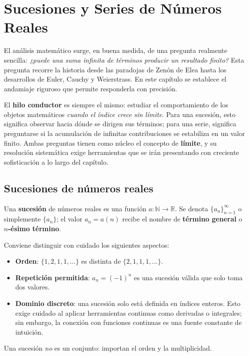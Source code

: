 
\chapter{Sucesiones y Series de Números Reales}

El análisis matemático surge, en buena medida, de una pregunta realmente sencilla: \emph{¿puede una suma infinita de términos producir un resultado
finito?} Esta pregunta recorre la historia desde las paradojas de Zenón de Elea
hasta los desarrollos de Euler, Cauchy y Weierstrass. En este capítulo se
establece el andamiaje riguroso que permite responderla con precisión.

El \textbf{hilo conductor} es siempre el mismo: estudiar el comportamiento de
los objetos matemáticos \emph{cuando el índice crece sin límite}. Para una
sucesión, esto significa observar hacia dónde se dirigen sus términos; para una
serie, significa preguntarse si la acumulación de infinitas contribuciones se
estabiliza en un valor finito. Ambas preguntas tienen como núcleo el concepto
de \textbf{límite}, y su resolución sistemática exige herramientas que se irán
presentando con creciente sofisticación a lo largo del capítulo.

\section{Sucesiones de números reales}

\begin{definition}
Una \textbf{sucesión} de números reales es una función $a : \mathbb{N}
\to \mathbb{R}$. Se denota $\{a_n\}_{n=1}^{\infty}$ o simplemente
$\{a_n\}$; el valor $a_n = a(n)$ recibe el nombre de \textbf{término
general} o \textbf{$n$-ésimo término}.
\end{definition}

\begin{rem}
Conviene distinguir con cuidado los siguientes aspectos:
\begin{itemize}
  \item \textbf{Orden}: $\{1,2,1,1,\ldots\}$ es distinta de $\{2,1,1,1,\ldots\}$.
  \item \textbf{Repetición permitida}: $a_n = (-1)^n$ es una sucesión válida
        que solo toma dos valores.
  \item \textbf{Dominio discreto}: una sucesión solo está definida en índices
        enteros. Esto exige cuidado al aplicar herramientas continuas como
        derivadas o integrales; sin embargo, la conexión con funciones
        continuas es una fuente constante de intuición.
\end{itemize}
Una sucesión \emph{no} es un conjunto: importan el orden y la multiplicidad.
\end{rem}

